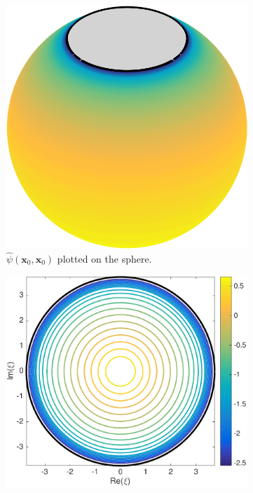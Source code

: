 \documentclass{sfuthesis}
\begin{document}
 \begin{figure}[h]
        \centering
        \begin{subfigure}[b]{0.35\textwidth}
        		\includegraphics[width=\textwidth]{Ex6-3CapPsiHat}
			\caption{\vspace{0.3cm}$\hat{\psi}(\mathbf{x}_0, \mathbf{x}_0)$ plotted on the sphere.}
     \end{subfigure} \hspace{1cm}
      \begin{subfigure}[b]{0.4\textwidth}
                \includegraphics[width=\textwidth]{Ex6-3CapPsiHatStereo}

\end{subfigure}
\end{figure}
\end{document}
